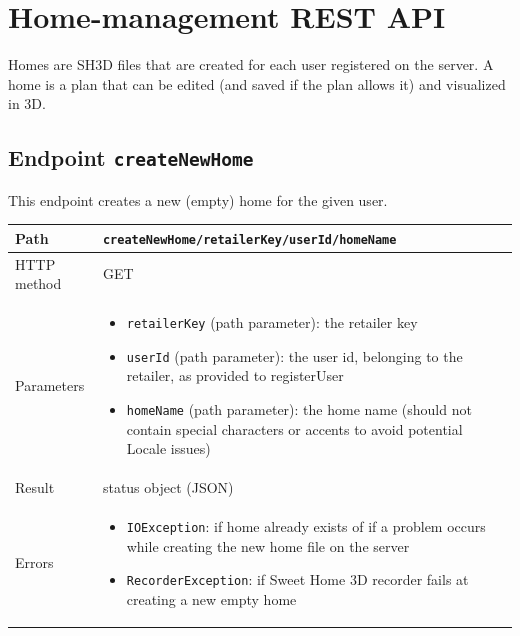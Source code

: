 \documentclass[a4paper]{report}
\begin{document}
\section{Home-management REST API}

Homes are SH3D files that are created for each user registered on the server. A home is a plan that can be edited (and saved if the plan allows it) and visualized in 3D.

\subsection{Endpoint \texttt{createNewHome}}

This endpoint creates a new (empty) home for the given user.

\begin{center}
\begin{tabularx} {\textwidth} { | l | X | }

\hline

Path & \texttt{createNewHome/retailerKey/userId/homeName} \\

\hline

HTTP method & GET \\

\hline

Parameters & \begin{itemize}[leftmargin=*,noitemsep,topsep=0px]
\item \texttt{retailerKey} (path parameter): the retailer key
\item \texttt{userId} (path parameter): the user id, belonging to the retailer, as provided to registerUser 
\item \texttt{homeName} (path parameter): the home name (should not contain special characters or accents to avoid potential Locale issues) 
\end{itemize} \\

\hline

Result & status object (JSON) \\

\hline

Errors & \begin{itemize}[leftmargin=*,noitemsep,topsep=0px]
\item \texttt{IOException}: if home already exists of if a problem occurs while creating the new home file on the server
\item \texttt{RecorderException}: if Sweet Home 3D recorder fails at creating a new empty home
\end{itemize} \\

\hline

\end{tabularx}
\end{center}
\end{document}
